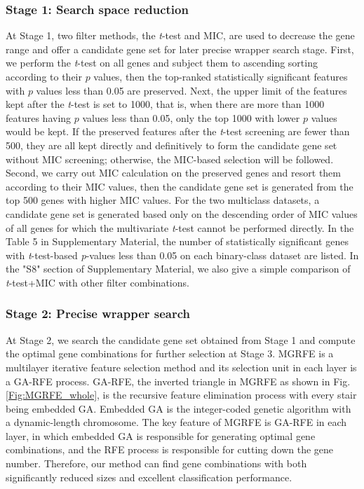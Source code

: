 \documentclass[10pt,journal,compsoc]{IEEEtran}
\begin{document}
	\subsubsection{Stage 1: Search space reduction}
	
	At Stage 1, two filter methods, the \textit{t}-test and MIC, are used to decrease the gene range and offer a candidate gene set for later precise wrapper search stage. First, we perform the \textit{t}-test on all genes and subject them to ascending sorting according to their $p$ values, then the top-ranked statistically significant features with $p$ values less than 0.05 are preserved. Next, the upper limit of the features kept after the \textit{t}-test is set to 1000, that is, when there are more than 1000 features having $p$ values less than 0.05, only the top 1000 with lower $p$ values would be kept. If the preserved features after the \textit{t}-test screening are fewer than 500, they are all kept directly and definitively to form the candidate gene set without MIC screening; otherwise, the MIC-based selection will be followed. Second, we carry out MIC calculation on the preserved genes and resort them according to their MIC values, then the candidate gene set is generated from the top 500 genes with higher MIC values. For the two multiclass datasets, a candidate gene set is generated based only on the descending order of MIC values of all genes for which the multivariate \textit{t}-test cannot be performed directly. 
	In the Table 5 in Supplementary Material, the number of statistically significant genes with \emph{t}-test-based \emph{p}-values less than 0.05 on each binary-class dataset are listed.
	In the "S8" section of Supplementary Material, we also give a simple comparison of \textit{t}-test+MIC with other filter combinations.

	\subsubsection{Stage 2: Precise wrapper search}
	
	At Stage 2, we search the candidate gene set obtained from Stage 1 and compute the optimal gene combinations for further selection at Stage 3. MGRFE is a multilayer iterative feature selection method and its selection unit in each layer is a GA-RFE process. GA-RFE, the inverted triangle in MGRFE as shown in Fig. \ref{Fig:MGRFE_whole}, is the recursive feature elimination process with every stair being embedded GA. Embedded GA is the integer-coded genetic algorithm with a dynamic-length chromosome. The key feature of MGRFE is GA-RFE in each layer, in which embedded GA is responsible for generating optimal gene combinations, and the RFE process is responsible for cutting down the gene number. Therefore, our method can find gene combinations with both significantly reduced sizes and excellent classification performance.
	
\end{document}
